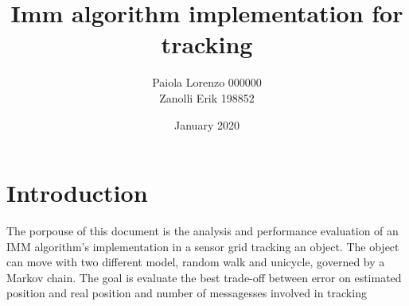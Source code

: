 \documentclass{article}
\title{Imm algorithm implementation for tracking}
\author{
Paiola Lorenzo 000000 

Zanolli Erik 198852}
\date{January 2020}
\begin{document}
\maketitle



\section*{Introduction}
\justify
The porpouse of this document is the analysis and performance evaluation of an IMM algorithm's implementation in
a sensor grid tracking an object. The object can move with two different model, random walk and unicycle, governed by
 a Markov chain. The goal is evaluate the best trade-off between error on estimated position and real position and number of 
 messagesses involved in tracking
\end{document}
